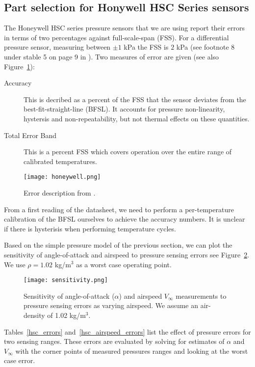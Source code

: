 \documentclass{article}
\begin{document}
\subsection{Part selection for Honywell HSC Series sensors}
The Honeywell HSC series pressure sensors that we are using report
their errors in terms of two percentages against full-scale-span
(FSS).  For a differential pressure sensor, measuring between $\pm 1$
kPa the FSS is $2$ kPa (see footnote 8 under stable 5 on page 9 in
\cite{Honeywell}).  Two measures of error are given (see also Figure~\ref{fig:accuracy}):
\begin{description}
\item[Accuracy] This is decribed as a percent of the FSS that the
  sensor deviates from the best-fit-straight-line (BFSL).  It accounts
  for pressure non-linearity, hystersis and non-repeatability, but not
  thermal effects on these quantities.
\item[Total Error Band] This is a percent FSS which covers operation
over the entire range of calibrated temperatures.
\end{description}
\begin{figure}
\centering
\texttt{[image: honeywell.png]}
\caption{Error description from \cite{Honeywell}\label{fig:accuracy}.}
\end{figure}
From a first reading of the datasheet, we need to perform a
per-temperature calibration of the BFSL ourselves to achieve the
accuracy numbers.  It is unclear if there is hysterisis when
performing temperature cycles.

Based on the simple pressure model of the previous section, we can
plot the sensitivity of angle-of-attack and airspeed to pressure
sensing errors see Figure~\ref{fig:sensitivity}.  We use $\rho = 1.02$
kg/m$^3$ as a worst case operating point.
\begin{figure}
\centering
\texttt{[image: sensitivity.png]}
\caption{Sensitivity of angle-of-attack ($\alpha$) and airspeed
  $V_\infty$ measurements to pressure sensing errors as varying
  airspeed.  We assume an air-density of 1.02 kg/m$^3$. \label{fig:sensitivity}}
\end{figure}
Tables~\ref{hsc_errors} and~\ref{hsc_airspeed_errors} list the effect
of pressure errors for two sensing ranges.  These errors are evaluated
by solving for estimates of $\alpha$ and $V_\infty$ with the corner
points of measured pressures ranges and looking at the worst case
error.
\end{document}
